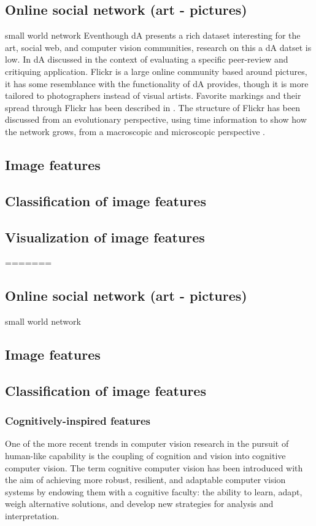 \subsection{Online social network (art - pictures)}
small world network
Eventhough dA presents a rich dataset interesting for the art, social web, and computer vision communities, research on this a dA datset is low. In \cite{DaMasters} dA discussed in the context of evaluating a specific peer-review and critiquing application.
Flickr is a large online community based around pictures, it has some resemblance with the functionality of dA provides, though it is more tailored to photographers instead of visual artists. Favorite markings and their spread through Flickr has been described in \cite{cha2009measurement}. The structure of Flickr has been discussed from an evolutionary perspective, using time information to show how the network grows, from a macroscopic \cite{kumar2006structure} and microscopic perspective \cite{leskovec2008microscopic}.
\subsection{Image features}
\subsection{Classification of image features}
\subsection{Visualization of image features}=======
\subsection{Online social network (art - pictures)}
small world network
\subsection{Image features}
\subsection{Classification of image features}

\subsubsection{Cognitively-inspired features}
One of the more recent trends in computer vision research in the pursuit of human-like capability is the coupling of cognition and vision into cognitive computer vision. The term cognitive computer vision has been introduced with the aim of achieving more robust, resilient, and adaptable computer vision systems by endowing them with a cognitive faculty: the ability to learn, adapt, weigh alternative solutions, and develop new strategies for analysis and interpretation.


